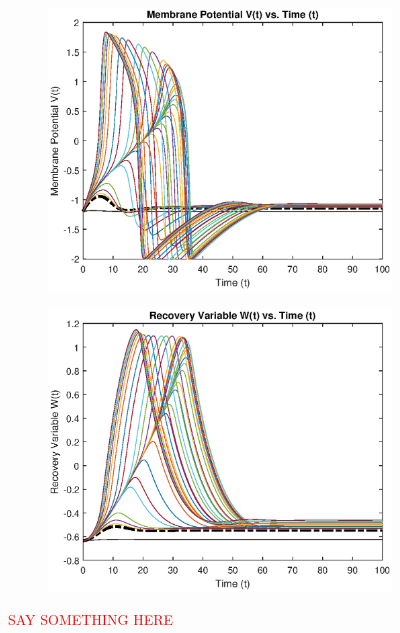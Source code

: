 \documentclass{book}
\theoremstyle{definition}
\begin{document}
\begin{figure}[!htb]
	\centering
	\begin{subfigure}{0.5\textwidth}
		\centering
		\includegraphics[scale=0.6]{FHN_lab/V_t_I_1.eps}
	\end{subfigure}%
	\begin{subfigure}{0.5\textwidth}
		\centering
		\includegraphics[scale=0.6]{FHN_lab/W_t_I_1.eps}
		
	\end{subfigure}%
	\caption{\textcolor{red}{SAY SOMETHING HERE}}
	\label{Fig:10}
\end{figure}
\end{document}
